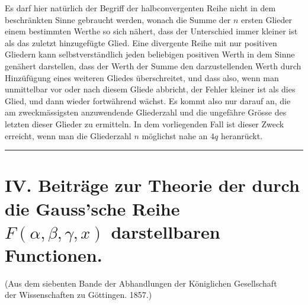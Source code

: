 \documentclass[12pt,a4paper]{book}
\theoremstyle{definition}
\theoremstyle{remark}
\begin{document}
Es darf hier natürlich der Begriff der halbconvergenten Reihe nicht in dem beschränkten Sinne gebraucht werden, wonach die Summe der $n$ ersten Glieder einem bestimmten Werthe so sich nähert, dass der Unterschied immer kleiner ist als das zuletzt hinzugefügte Glied. Eine divergente Reihe mit nur positiven Gliedern kann selbstverständlich jeden beliebigen positiven Werth in dem Sinne genähert darstellen, dass der Werth der Summe den darzustellenden Werth durch Hinzüfügung eines weiteren Gliedes überschreitet, und dass also, wenn man unmittelbar vor oder nach diesem Gliede abbricht, der Fehler kleiner ist als dies Glied, und dann wieder fortwährend wächst. Es kommt also nur darauf an, die am zweckmässigsten anzuwendende Gliederzahl und die ungefähre Grösse des letzten dieser Glieder zu ermitteln. In dem vorliegenden Fall ist dieser Zweck erreicht, wenn man die Gliederzahl $n$ möglichst nahe an $4q$ heranrückt.

\vspace{2em}
\begin{center}
\rule{0.5\textwidth}{0.4pt}
\end{center}
\vspace{1em}


\section*{IV. Beiträge zur Theorie der durch die Gauss'sche Reihe\\
$F(\alpha, \beta, \gamma, x)$ darstellbaren Functionen.}

\begin{center}
\small
(Aus dem siebenten Bande der Abhandlungen der Königlichen Gesellschaft\\
der Wissenschaften zu Göttingen. 1857.)
\end{center}
\vspace{0.5em}
\end{document}

